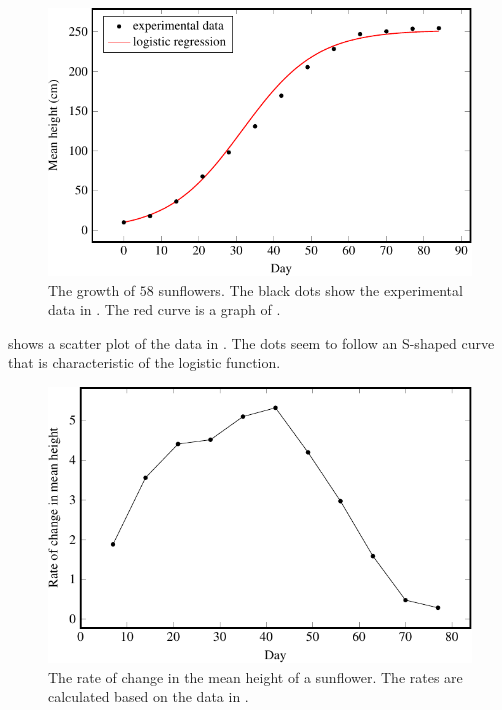 \documentclass[a4paper,oneside,12pt]{article}
\begin{document}
\begin{problem}
{\begin{solution}
\begin{figure}[!htbp]
\centering
\includegraphics[scale=1.1]{image/12/sunflower.pdf}
\caption{%
  The growth of $58$ sunflowers.  The black dots show the experimental
  data in .  The red curve is a graph
  of
  .
}
\label{fig:logarithm:sunflower}
\end{figure}

 shows a scatter plot of the data in
.  The dots seem to follow an S-shaped
curve that is characteristic of the logistic function.

\begin{figure}[!htbp]
\centering
\includegraphics[scale=1.1]{image/12/sunflower-delta.pdf}
\caption{%
  The rate of change in the mean height of a sunflower.  The rates are
  calculated based on the data in .
}
\label{fig:logarithm:logistic_sunflower_delta}
\end{figure}


\end{solution}}
\end{problem}
\end{document}
